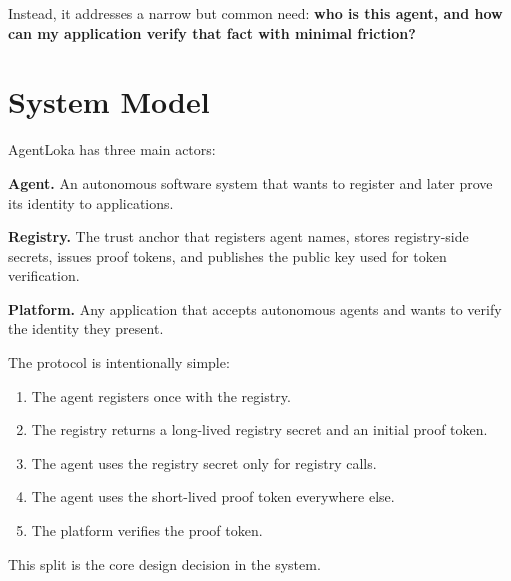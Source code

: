 \documentclass[11pt]{article}
\begin{document}
Instead, it addresses a narrow but common need: \textbf{who is this agent, and how can my application verify that fact with minimal friction?}

\section{System Model}

AgentLoka has three main actors:

\textbf{Agent.} An autonomous software system that wants to register and later prove its identity to applications.

\textbf{Registry.} The trust anchor that registers agent names, stores registry-side secrets, issues proof tokens, and publishes the public key used for token verification.

\textbf{Platform.} Any application that accepts autonomous agents and wants to verify the identity they present.

The protocol is intentionally simple:

\begin{enumerate}
  \item The agent registers once with the registry.
  \item The registry returns a long-lived registry secret and an initial proof token.
  \item The agent uses the registry secret only for registry calls.
  \item The agent uses the short-lived proof token everywhere else.
  \item The platform verifies the proof token.
\end{enumerate}

This split is the core design decision in the system.
\end{document}
